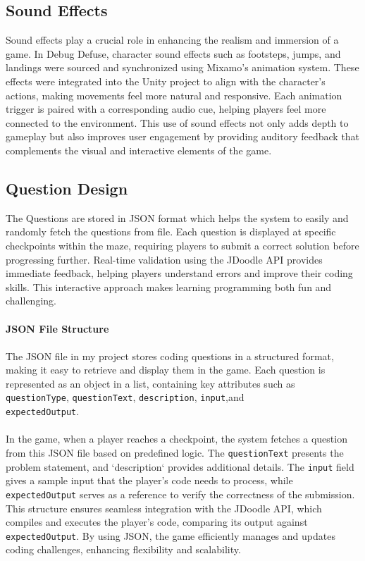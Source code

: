 \subsection{Sound Effects}
Sound effects play a crucial role in enhancing the realism and immersion of a game. In Debug Defuse, character sound effects such as footsteps, jumps, and landings were sourced and synchronized using Mixamo’s animation system. These effects were integrated into the Unity project to align with the character’s actions, making movements feel more natural and responsive. Each animation trigger is paired with a corresponding audio cue, helping players feel more connected to the environment. This use of sound effects not only adds depth to gameplay but also improves user engagement by providing auditory feedback that complements the visual and interactive elements of the game.
\subsection{Question Design}
The Questions are stored in JSON format which helps the system to easily and  randomly fetch the questions from file. Each question is displayed at specific checkpoints within the maze, requiring players to submit a correct solution before progressing further. Real-time validation using the JDoodle API provides immediate feedback, helping players understand errors and improve their coding skills. This interactive approach makes learning programming both fun and challenging.\\\\
\textbf{JSON File Structure}\\\\
The JSON file in my project stores coding questions in a structured format, making it easy to retrieve and display them in the game. Each question is represented as an object in a list, containing key attributes such as \texttt{questionType}, \texttt{questionText}, \texttt{description}, \texttt{input},and\\
\texttt{expectedOutput}. 
\\\\
In the game, when a player reaches a checkpoint, the system fetches a question from this JSON file based on predefined logic. The \texttt{questionText} presents the problem statement, and `description` provides additional details. The \texttt{input} field gives a sample input that the player’s code needs to process, while \texttt{expectedOutput} serves as a reference to verify the correctness of the submission. This structure ensures seamless integration with the JDoodle API, which compiles and executes the player’s code, comparing its output against \texttt{expectedOutput}. By using JSON, the game efficiently manages and updates coding challenges, enhancing flexibility and scalability.

